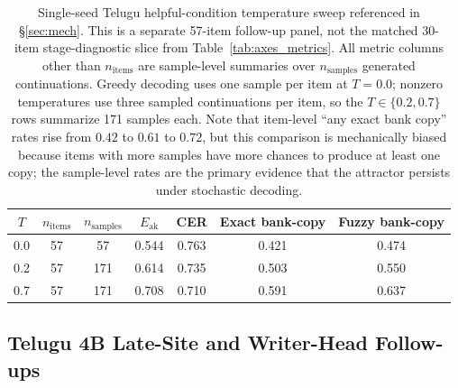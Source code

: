 \documentclass{article}
\begin{document}
\begin{table}[t]
\centering
\small
\setlength{\tabcolsep}{8pt}
\begin{tabular}{ccccccc}
\toprule
\textbf{$T$} & \textbf{$n_{\mathrm{items}}$} & \textbf{$n_{\mathrm{samples}}$} & \textbf{$E_{\mathrm{ak}}$} & \textbf{CER} & \textbf{Exact bank-copy} & \textbf{Fuzzy bank-copy} \\
\midrule
0.0 & 57 & 57  & 0.544 & 0.763 & 0.421 & 0.474 \\
0.2 & 57 & 171 & 0.614 & 0.735 & 0.503 & 0.550 \\
0.7 & 57 & 171 & 0.708 & 0.710 & 0.591 & 0.637 \\
\bottomrule
\end{tabular}
\caption{Single-seed Telugu helpful-condition temperature sweep referenced in \S\ref{sec:mech}. This is a separate 57-item follow-up panel, not the matched 30-item stage-diagnostic slice from Table~\ref{tab:axes_metrics}. All metric columns other than $n_{\mathrm{items}}$ are sample-level summaries over $n_{\mathrm{samples}}$ generated continuations. Greedy decoding uses one sample per item at $T{=}0.0$; nonzero temperatures use three sampled continuations per item, so the $T \in \{0.2, 0.7\}$ rows summarize 171 samples each. Note that item-level ``any exact bank copy'' rates rise from $0.42$ to $0.61$ to $0.72$, but this comparison is mechanically biased because items with more samples have more chances to produce at least one copy; the sample-level rates are the primary evidence that the attractor persists under stochastic decoding.}
\label{tab:tempsweep}
\end{table}

\subsection{Telugu 4B Late-Site and Writer-Head Follow-ups}\label{app:telugu_followups}
\end{document}
